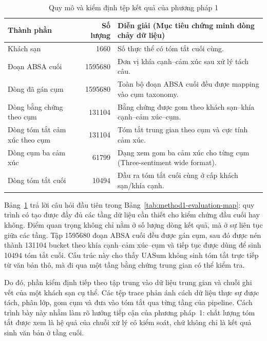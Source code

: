 \begin{table}[htbp]
\centering
\caption{Quy mô và kiểm định tệp kết quả của phương pháp 1}
\label{tab:method1-scale-validation}
\small
\renewcommand{\arraystretch}{1.2}
\begin{tabular}{l r p{7.5cm}}
\toprule
\textbf{Thành phần} & \textbf{Số lượng} & \textbf{Diễn giải (Mục tiêu chứng minh dòng chảy dữ liệu)} \\
\midrule
Khách sạn & \num{1660} & Số thực thể có tóm tắt cuối cùng. \\
Đoạn ABSA cuối & \num{1595680} & Đơn vị khía cạnh--cảm xúc sau xử lý tách câu. \\
Dòng đã gán cụm & \num{1595680} & Toàn bộ đoạn ABSA cuối đều được mapping vào cụm taxonomy. \\
Dòng bằng chứng theo cụm & \num{131104} & Bằng chứng được gom theo khách sạn--khía cạnh--cảm xúc--cụm. \\
Dòng tóm tắt cảm xúc theo cụm & \num{131104} & Tóm tắt trung gian theo cụm và cực tính cảm xúc. \\
Dòng cụm ba cảm xúc & \num{61799} & Dạng xem gom ba cảm xúc cho từng cụm (Three-sentiment wide format). \\
Dòng tóm tắt cuối & \num{10494} & Đầu ra tóm tắt cuối cùng ở cấp khách sạn/khía cạnh. \\
\bottomrule
\end{tabular}
\end{table}

Bảng~\ref{tab:method1-scale-validation} trả lời câu hỏi đầu tiên trong Bảng~\ref{tab:method1-evaluation-map}: quy trình có tạo được đầy đủ các tầng dữ liệu cần thiết cho kiểm chứng đầu cuối hay không. Điểm quan trọng không chỉ nằm ở số lượng dòng kết quả, mà ở sự liên tục giữa các tầng. Tập \num{1595680} đoạn ABSA cuối đều được gán cụm, sau đó được nén thành \num{131104} bucket theo khía cạnh--cảm xúc--cụm và tiếp tục được dùng để sinh \num{10494} tóm tắt cuối. Cấu trúc này cho thấy UASum không sinh tóm tắt trực tiếp từ văn bản thô, mà đi qua một tầng bằng chứng trung gian có thể kiểm tra.

Do đó, phần kiểm định tiếp theo tập trung vào dữ liệu trung gian và chuỗi ghi vết của một khách sạn cụ thể. Các tệp trace phản ánh cách dữ liệu thực sự được tách, phân lớp, gom cụm và đưa vào tóm tắt qua từng tầng của pipeline. Cách trình bày này nhằm làm rõ hướng tiếp cận của phương pháp~1: chất lượng tóm tắt được xem là hệ quả của chuỗi xử lý có kiểm soát, chứ không chỉ là kết quả sinh văn bản ở tầng cuối.

